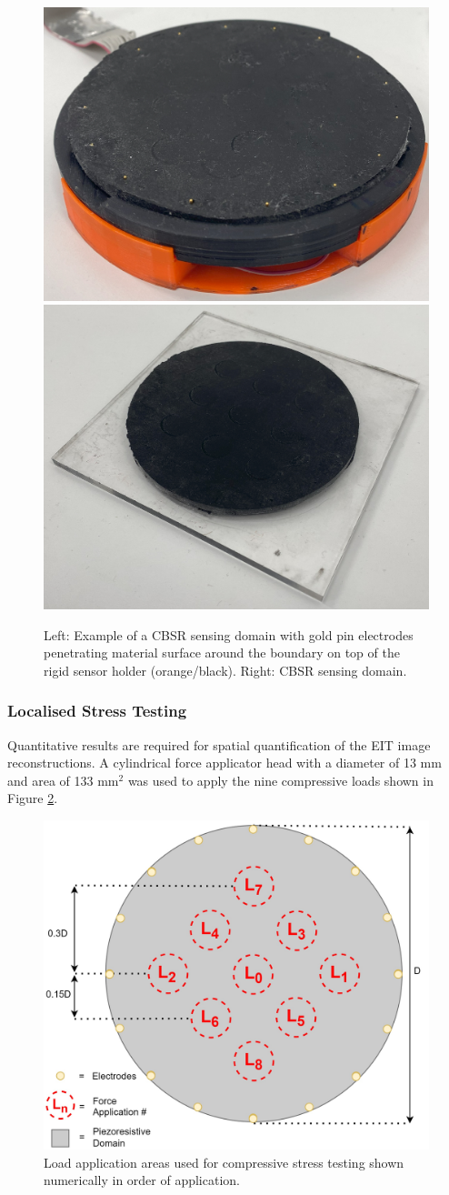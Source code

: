 \begin{figure}[H]
    \centering
    \includegraphics[width=0.3\linewidth]{Figures/CBSR_DUT_w_electrodes_sample.jpg}
    \includegraphics[width=0.3\linewidth]{Figures/CBSR_DUT_sample.jpg}
    \caption{Left: Example of a CBSR sensing domain with gold pin electrodes penetrating material surface around the boundary on top of the rigid sensor holder (orange/black). Right: CBSR sensing domain.}
    \label{fig:CBSR sample and holder}
\end{figure}

\subsubsection{Localised Stress Testing} \label{sec:Localised Stress Testing}
Quantitative results are required for spatial quantification of the EIT image reconstructions. A cylindrical force applicator head with a diameter of 13 mm and area of 133 mm$^2$ was used to apply the nine compressive loads shown in Figure \ref{fig:force_app_map}.
\begin{figure}[H]
    \centering
    \includegraphics[width=0.6\linewidth]{Figures/EIT_force_app_points_v3.11.jpg}
    \caption{Load application areas used for compressive stress testing shown numerically in order of application.}
    \label{fig:force_app_map}
\end{figure}

